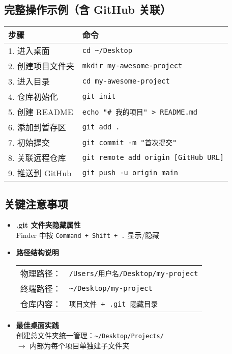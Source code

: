 \subsection{完整操作示例（含 GitHub 关联）}
\begin{center}
\begin{tabular}{ll}
    \toprule
    \textbf{步骤} & \textbf{命令} \\
    \midrule
    1. 进入桌面 & \texttt{cd \textasciitilde/Desktop} \\
    2. 创建项目文件夹 & \texttt{mkdir my-awesome-project} \\
    3. 进入目录 & \texttt{cd my-awesome-project} \\
    4. 仓库初始化 & \texttt{git init} \\
    5. 创建 README & \texttt{echo "\# 我的项目" > README.md} \\
    6. 添加到暂存区 & \texttt{git add .} \\
    7. 初始提交 & \texttt{git commit -m "首次提交"} \\
    8. 关联远程仓库 & \texttt{git remote add origin [GitHub URL]} \\
    9. 推送到 GitHub & \texttt{git push -u origin main} \\
    \bottomrule
\end{tabular}
\end{center}

\subsection{关键注意事项}
\begin{itemize}[leftmargin=*, nosep]
    \item \textbf{.git 文件夹隐藏属性} \\
    Finder 中按 \texttt{Command + Shift + .} 显示/隐藏
    
    \item \textbf{路径结构说明} \\
    \begin{tabular}{@{}ll@{}}
        物理路径： & \texttt{/Users/用户名/Desktop/my-project} \\
        终端路径： & \texttt{\textasciitilde/Desktop/my-project} \\
        仓库内容： & \texttt{项目文件 + .git 隐藏目录}
    \end{tabular}
    
    \item \textbf{最佳桌面实践} \\
    创建总文件夹统一管理：\texttt{\textasciitilde/Desktop/Projects/} \\
    $\rightarrow$ 内部为每个项目单独建子文件夹
\end{itemize}

